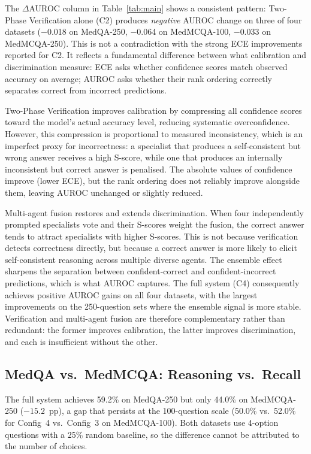 \documentclass[10pt]{article}
\begin{document}
The $\Delta$AUROC column in Table~\ref{tab:main} shows a consistent pattern:
Two-Phase Verification alone (C2) produces
\emph{negative} AUROC change on three of four datasets ($-$0.018 on
MedQA-250, $-$0.064 on MedMCQA-100, $-$0.033 on MedMCQA-250).  This
is not a contradiction with the strong ECE improvements reported for
C2.  It reflects a fundamental difference between what calibration and
discrimination measure: ECE asks whether confidence scores match observed
accuracy on average; AUROC asks whether their rank ordering correctly
separates correct from incorrect predictions.

Two-Phase Verification improves calibration by compressing all confidence
scores toward the model's actual accuracy level, reducing systematic
overconfidence.  However, this compression is proportional to measured
inconsistency, which is an imperfect proxy for incorrectness: a specialist
that produces a self-consistent but wrong answer receives a high S-score,
while one that produces an internally inconsistent but correct answer is
penalised.  The absolute values of confidence improve (lower ECE), but the
rank ordering does not reliably improve alongside them, leaving AUROC
unchanged or slightly reduced.

Multi-agent fusion restores and extends discrimination.  When four
independently prompted specialists vote and their S-scores weight the fusion,
the correct answer tends to attract specialists with higher S-scores.  This
is not because verification detects correctness directly, but because a
correct answer is more likely to elicit self-consistent reasoning across
multiple diverse agents.  The ensemble effect sharpens the separation between
confident-correct and confident-incorrect predictions, which is what AUROC
captures.  The full system (C4) consequently achieves positive AUROC gains on
all four datasets, with the largest improvements on the 250-question sets
where the ensemble signal is more stable.  Verification and multi-agent fusion
are therefore complementary rather than redundant: the former improves
calibration, the latter improves discrimination, and each is insufficient
without the other.

\subsection{MedQA vs.\ MedMCQA: Reasoning vs.\ Recall}

The full system achieves 59.2\% on MedQA-250 but only 44.0\% on MedMCQA-250
($-15.2$~pp), a gap that persists at the 100-question scale (50.0\% vs.\
52.0\% for Config~4 vs.\ Config~3 on MedMCQA-100).  Both datasets use
4-option questions with a 25\% random baseline, so the difference cannot be
attributed to the number of choices.
\end{document}
